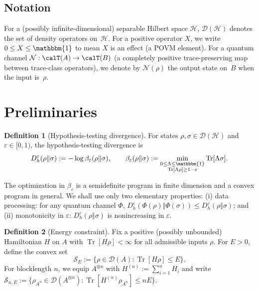 \documentclass[11pt]{article}
\theoremstyle{definition}
\newtheorem{definition}{Definition}
\DeclareMathOperator{\Tr}{Tr}
\newcommand{\id}{\mathbbm{1}}
\newcommand{\Dheps}[1]{D_h^{#1}}
\newcommand{\calN}{\mathcal{N}}
\newcommand{\calH}{\mathcal{H}}
\newcommand{\calD}{\mathcal{D}}
\newcommand{\calS}{\mathcal{S}}
\begin{document}
\subsection*{Notation}
For a (possibly infinite-dimensional) separable Hilbert space $\calH$, $\calD(\calH)$ denotes the set of density operators on~$\calH$.
For a positive operator $X$, we write $0\le X\le \id$ to mean $X$ is an effect (a POVM element). For a quantum channel $\calN: \calT(A)\to\calT(B)$ (a completely positive trace-preserving map between trace-class operators), we denote by $\calN(\rho)$ the output state on~$B$ when the input is~$\rho$.

\section{Preliminaries}
\begin{definition}[Hypothesis-testing divergence]
For states $\rho,\sigma \in \calD(\calH)$ and $\varepsilon \in [0,1)$, the hypothesis-testing divergence is
\begin{equation}\label{eq:Dh-def}
\Dheps{\varepsilon}(\rho\Vert \sigma) := -\log \beta_\varepsilon(\rho\Vert \sigma),
\qquad
\beta_\varepsilon(\rho\Vert \sigma)
:= \min_{\substack{0\le \Lambda \le \id\\ \Tr[\Lambda\rho]\ge 1-\varepsilon}} \Tr[\Lambda\sigma].
\end{equation}
\end{definition}
The optimization in $\beta_\varepsilon$ is a semidefinite program in finite dimension and a convex program in general.
We shall use only two elementary properties: (i) data processing: for any quantum channel $\Phi$, $\Dheps{\varepsilon}(\Phi(\rho)\Vert \Phi(\sigma)) \le \Dheps{\varepsilon}(\rho\Vert \sigma)$; and (ii) monotonicity in $\varepsilon$: $\Dheps{\varepsilon}(\rho\Vert \sigma)$ is nonincreasing in $\varepsilon$.

\begin{definition}[Energy constraint]
Fix a positive (possibly unbounded) Hamiltonian $H$ on $A$ with $\Tr[H\rho]<\infty$ for all admissible inputs $\rho$.
For $E>0$, define the convex set
\begin{equation}
\calS_E := \bigl\{\rho\in\calD(A): \Tr[H\rho] \le E\bigr\}.
\end{equation}
For blocklength $n$, we equip $A^{\otimes n}$ with $H^{(n)} := \sum_{i=1}^n H_i$ and write
$\calS_{n,E} := \{\rho_{A^n}\in\calD(A^{\otimes n}) : \Tr[H^{(n)}\rho_{A^n}] \le nE\}$.
\end{definition}
\end{document}
